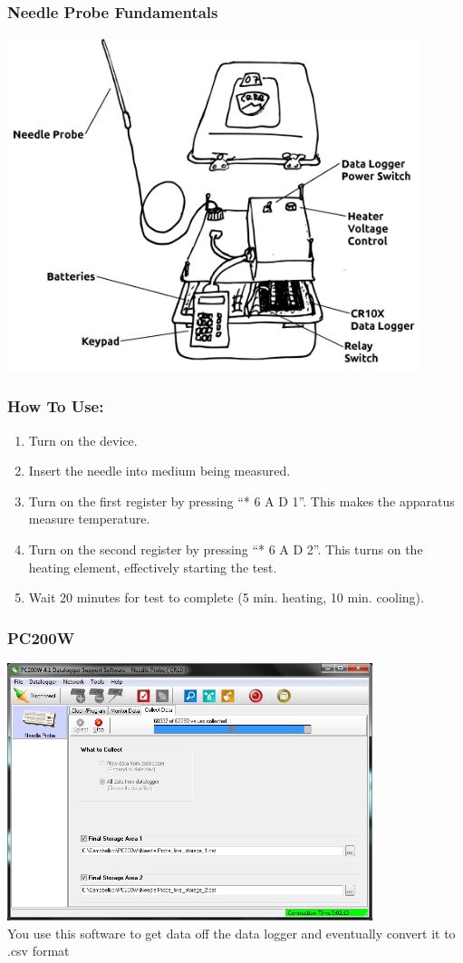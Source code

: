 \documentclass{beamer}
\begin{document}
\begin{frame}
\frametitle{Needle Probe Fundamentals}
\includegraphics[width=0.9\textwidth]{fig/apparatus.png}
\end{frame}


\begin{frame}
\frametitle{How To Use:}
\begin{enumerate}
\item Turn on the device.
\item Insert the needle into medium being measured.
\item Turn on the first register by pressing ``* 6 A D 1''. This makes the
apparatus measure temperature.
\item Turn on the second register by pressing ``* 6 A D 2''. This turns on the
heating element, effectively starting the test.
\item Wait 20 minutes for test to complete (5 min. heating, 10 min. cooling).
\end{enumerate}
\end{frame}


\begin{frame}
\frametitle{PC200W}
\includegraphics[width=0.8\textwidth]{fig/pc200w.png}\\
You use this software to get data off the data logger and eventually convert it
to .csv format
\end{frame}
\end{document}
